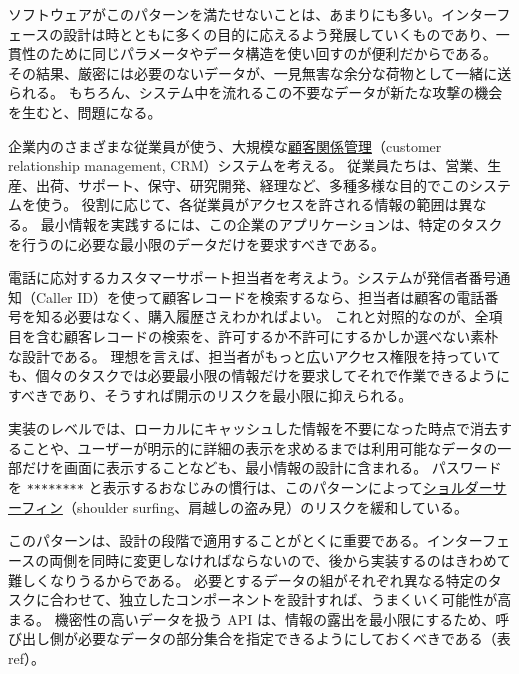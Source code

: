 \documentclass[uplatex]{jsarticle}
\def\ref#1{ref}%
\def\label#1{}%
\begin{document}
ソフトウェアがこのパターンを満たせないことは、あまりにも多い。インターフェースの設計は時とともに多くの目的に応えるよう発展していくものであり、一貫性のために同じパラメータやデータ構造を使い回すのが便利だからである。
その結果、厳密には必要のないデータが、一見無害な余分な荷物として一緒に送られる。
もちろん、システム中を流れるこの不要なデータが新たな攻撃の機会を生むと、問題になる。

\begin{exa}\label{exa:ch4-crm}
企業内のさまざまな従業員が使う、大規模な\underline{顧客関係管理}（customer relationship management, CRM）システムを考える。
従業員たちは、営業、生産、出荷、サポート、保守、研究開発、経理など、多種多様な目的でこのシステムを使う。
役割に応じて、各従業員がアクセスを許される情報の範囲は異なる。
最小情報を実践するには、この企業のアプリケーションは、特定のタスクを行うのに必要な最小限のデータだけを要求すべきである。

電話に応対するカスタマーサポート担当者を考えよう。システムが発信者番号通知（Caller ID）を使って顧客レコードを検索するなら、担当者は顧客の電話番号を知る必要はなく、購入履歴さえわかればよい。
これと対照的なのが、全項目を含む顧客レコードの検索を、許可するか不許可にするかしか選べない素朴な設計である。
理想を言えば、担当者がもっと広いアクセス権限を持っていても、個々のタスクでは必要最小限の情報だけを要求してそれで作業できるようにすべきであり、そうすれば開示のリスクを最小限に抑えられる。
\end{exa}

実装のレベルでは、ローカルにキャッシュした情報を不要になった時点で消去することや、ユーザーが明示的に詳細の表示を求めるまでは利用可能なデータの一部だけを画面に表示することなども、最小情報の設計に含まれる。
パスワードを \texttt{********} と表示するおなじみの慣行は、このパターンによって\underline{ショルダーサーフィン}（shoulder surfing、肩越しの盗み見）のリスクを緩和している。

このパターンは、設計の段階で適用することがとくに重要である。インターフェースの両側を同時に変更しなければならないので、後から実装するのはきわめて難しくなりうるからである。
必要とするデータの組がそれぞれ異なる特定のタスクに合わせて、独立したコンポーネントを設計すれば、うまくいく可能性が高まる。
機密性の高いデータを扱う API は、情報の露出を最小限にするため、呼び出し側が必要なデータの部分集合を指定できるようにしておくべきである（表 \ref{tab:ch4-least-information-api}）。
\end{document}
